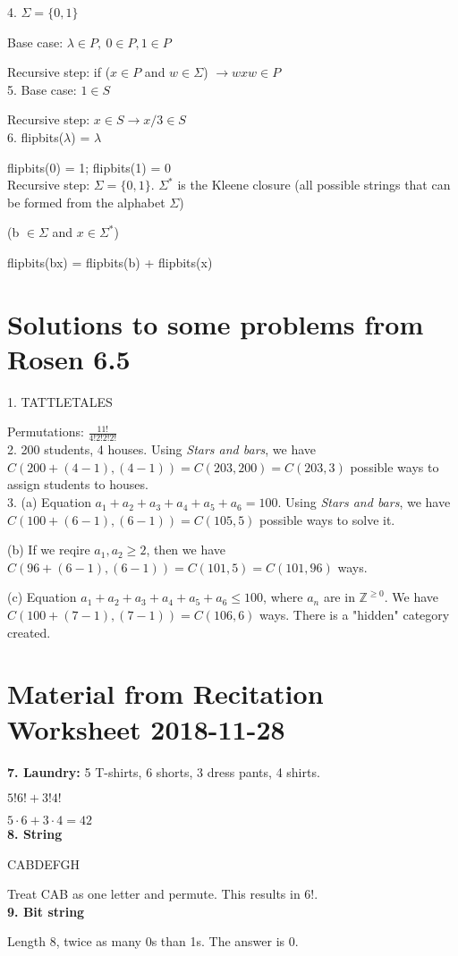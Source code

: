 \documentclass[english,openany]{book}
\begin{document}
    4. $\Sigma = \{0,1\}$

    Base case: $\lambda \in P,\ 0 \in P, 1 \in P$

    Recursive step: if ($x \in P$ and $w \in \Sigma$) $\rightarrow wxw \in P$\\

    5. Base case: $1 \in S$

    Recursive step: $x \in S \rightarrow x/3 \in S$\\

    6. flipbits($\lambda$) = $\lambda$

    flipbits(0) = 1; flipbits(1) = 0\\

    Recursive step: $\Sigma = \{0,1\}$. $\Sigma^*$ is the Kleene closure (all possible strings that can be formed from the alphabet $\Sigma$)

    (b $\in \Sigma$ and $x \in \Sigma^*$)

    flipbits(bx) = flipbits(b) + flipbits(x)\\

    \section{Solutions to some problems from Rosen 6.5}

    1. TATTLETALES

    Permutations: $\frac{11!}{4!2!2!2!}$\\

    2. 200 students, 4 houses. Using \textit{Stars and bars}, we have $C(200+(4-1), (4-1)) = C(203, 200) = C(203, 3)$ possible ways to assign students to houses.\\

    3. (a) Equation $a_1 + a_2 + a_3 + a_4 + a_5 + a_6 = 100$. Using \textit{Stars and bars}, we have $C(100+(6-1), (6-1)) = C(105, 5)$ possible ways to solve it.

    (b) If we reqire $a_1, a_2 \geq 2$, then we have $C(96+(6-1), (6-1)) = C(101,5) = C(101, 96)$ ways.

    (c) Equation $a_1 + a_2 + a_3 + a_4 + a_5 + a_6 \leq 100$, where $a_n$ are in $\mathbb Z^{\geq 0}$. We have $C(100+(7-1), (7-1)) = C(106,6)$ ways. There is a "hidden" category created.\\

    \section{Material from Recitation Worksheet 2018-11-28}

    \textbf{7. Laundry:} 5 T-shirts, 6 shorts, 3 dress pants, 4 shirts.

    $5!6! + 3!4!$

    $5 \cdot 6 + 3 \cdot 4 = 42$\\

    \textbf{8. String}

    CABDEFGH

    Treat CAB as one letter and permute. This results in $6!$.\\

    \textbf{9. Bit string}

    Length 8, twice as many 0s than 1s. The answer is 0.
\end{document}
